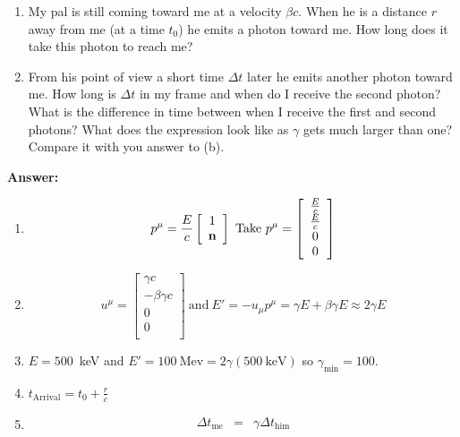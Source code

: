 \documentclass[pdftex,10pt]{article}
\begin{document}
\begin{enumerate}
\begin{enumerate}
\item My pal is still coming toward me at a velocity $\beta c$. When
  he is a distance $r$ away from me (at a time $t_0$) he emits a photon
  toward me. How long does it take this photon to reach me?

\item From his point of view a short time $\Delta t$ later he emits
  another photon toward me. How long is $\Delta t$ in my frame and
  when do I receive the second photon? What is the difference in time
  between when I receive the first and second photons? What does the
  expression look like as $\gamma$ gets much larger than one? Compare
  it with you answer to (b).
\end{enumerate}

{\bf Answer:}
\begin{enumerate}
\item 
\begin{equation}
p^\mu = \frac{E}{c} \left [ \begin{array}{c} 
    1 \\
    {\bf n} 
  \end{array}
\right ]
~\mathrm{Take}~
p^\mu = \left [ \begin{array}{c} 
    \frac{E}{c} \\
    \frac{E}{c} \\
    0 \\
    0 \\
  \end{array}
\right ]
\end{equation}
\item
\begin{equation}
u^\mu = \left [ \begin{array}{c} 
    \gamma c \\
    -\beta \gamma c \\
    0 \\
    0 \\
  \end{array}
\right ]
~\mathrm{and}~E'=-u_\mu p^\mu = \gamma E + \beta \gamma E \approx 2
\gamma E
\end{equation}
\item 
$E=500$~keV and $E'=100~\mathrm{Mev}=2\gamma (500~\mathrm{keV})$ so
$\gamma_\mathrm{min} =100$.
\item
$t_\mathrm{Arrival} = t_0 + \frac{r}{c}$
\item
\begin{eqnarray}
\Delta t_\mathrm{me} &=& \gamma \Delta t_\mathrm{him} \\

\end{eqnarray}
\end{enumerate}
\end{enumerate}
\end{document}
